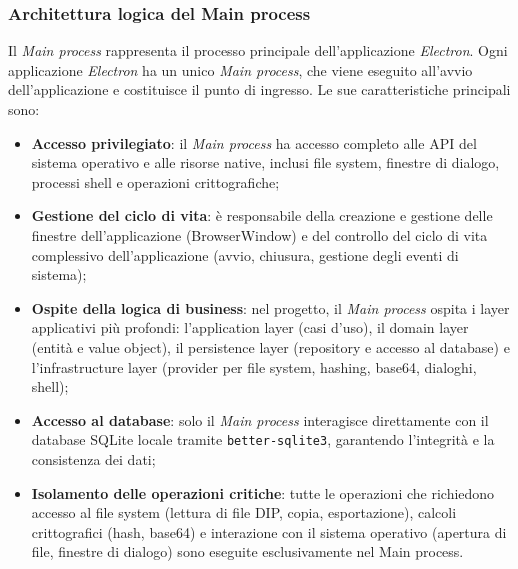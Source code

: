 \documentclass[a4paper,12pt]{article}
\begin{document}
{{            \subsubsection{Architettura logica del Main process} {
                Il \textit{{Main process}} rappresenta il processo principale dell'applicazione \textit{Electron}. Ogni applicazione \textit{Electron} ha un unico \textit{Main process}, che viene eseguito all'avvio dell'applicazione e costituisce il punto di ingresso. Le sue caratteristiche principali sono:
                \begin{itemize}
                    \item \textbf{Accesso privilegiato}: il \textit{Main process} ha accesso completo alle API del sistema operativo e alle risorse native, inclusi file system, finestre di dialogo, processi shell e operazioni crittografiche;
                    \item \textbf{Gestione del ciclo di vita}: è responsabile della creazione e gestione delle finestre dell'applicazione (BrowserWindow) e del controllo del ciclo di vita complessivo dell'applicazione (avvio, chiusura, gestione degli eventi di sistema);
                    \item \textbf{Ospite della logica di business}: nel progetto, il \textit{Main process} ospita i layer applicativi più profondi: l'application layer (casi d'uso), il domain layer (entità e value object), il persistence layer (repository e accesso al database) e l'infrastructure layer (provider per file system, hashing, base64, dialoghi, shell);
                    \item \textbf{Accesso al database}: solo il \textit{Main process} interagisce direttamente con il database SQLite locale tramite \texttt{better-sqlite3}, garantendo l'integrità e la consistenza dei dati;
                    \item \textbf{Isolamento delle operazioni critiche}: tutte le operazioni che richiedono accesso al file system (lettura di file DIP, copia, esportazione), calcoli crittografici (hash, base64) e interazione con il sistema operativo (apertura di file, finestre di dialogo) sono eseguite esclusivamente nel Main process.
                \end{itemize}
                
}}}
\end{document}
